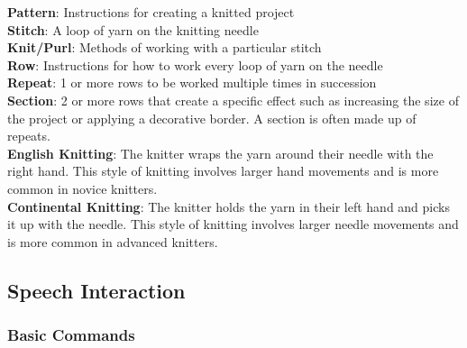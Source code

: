 \documentclass[11pt,twocolumn]{article}
\begin{document}
\textbf{Pattern}: Instructions for creating a knitted project
\\
\textbf{Stitch}: A loop of yarn on the knitting needle
\\
\textbf{Knit/Purl}: Methods of working with a particular stitch
\\
\textbf{Row}: Instructions for how to work every loop of yarn on the needle
\\
\textbf{Repeat}: 1 or more rows to be worked multiple times in succession
\\
\textbf{Section}: 2 or more rows that create a specific effect such as increasing the size of the project or applying a decorative border. A section is often made up of repeats.
\\
\textbf{English Knitting}: The knitter wraps the yarn around their needle with the right hand. This style of knitting involves larger hand movements and is more common in novice knitters.
\\
\textbf{Continental Knitting}: The knitter holds the yarn in their left hand and picks it up with the needle. This style of knitting involves larger needle movements and is more common in advanced knitters.

\subsection{Speech Interaction} \label{speech-commands}

\subsubsection{Basic Commands}
\end{document}
